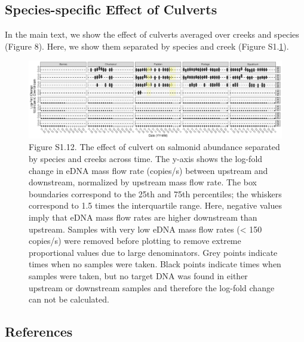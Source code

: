\documentclass[
]{article}
\begin{document}
\hypertarget{species-specific-effect-of-culverts}{%
\subsection{Species-specific Effect of
Culverts}\label{species-specific-effect-of-culverts}}

In the main text, we show the effect of culverts averaged over creeks
and species (Figure 8). Here, we show them separated by species and
creek (Figure S1.\ref{fig:culvertsspeciescreek}).

\begin{figure}
\centering
\includegraphics{../Output/SupplementalFigures/culvert_boxplot_separated.png}
\caption{Figure S1.12. The effect of culvert on salmonid abundance
separated by species and creeks across time. The y-axis shows the
log-fold change in eDNA mass flow rate (copies/s) between upstream and
downstream, normalized by upstream mass flow rate. The box boundaries
correspond to the 25th and 75th percentiles; the whiskers correspond to
1.5 times the interquartile range. Here, negative values imply that eDNA
mass flow rates are higher downstream than upstream. Samples with very
low eDNA mass flow rates (\textless{} 150 copies/s) were removed before
plotting to remove extreme proportional values due to large
denominators. Grey points indicate times when no samples were taken.
Black points indicate times when samples were taken, but no target DNA
was found in either upstream or downstream samples and therefore the
log-fold change can not be calculated.\label{fig:culvertsspeciescreek}}
\end{figure}

\hypertarget{references}{%
\subsection*{References}\label{references}}
\end{document}
